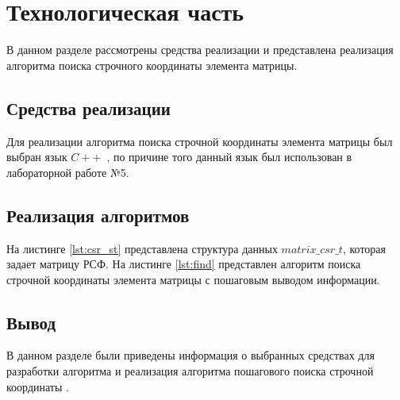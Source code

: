 \chapter{Технологическая часть}

В данном разделе рассмотрены средства реализации и представлена реализация алгоритма поиска строчного координаты элемента матрицы.

\section{Средства реализации}

Для реализации алгоритма поиска строчной координаты элемента матрицы был выбран язык $C++$~\cite{cpp-lang}, по причине того данный язык был использован в лабораторной работе №5. 

\section{Реализация алгоритмов}

На листинге \ref{lst:csr_st} представлена структура данных $matrix\_csr\_t$, которая задает матрицу РСФ.
На листинге \ref{lst:find} представлен алгоритм поиска строчной координаты элемента матрицы с пошаговым выводом информации.



\clearpage



\clearpage

\section*{Вывод}

В данном разделе были приведены информация о выбранных средствах для разработки алгоритма и реализация алгоритма пошагового поиска строчной координаты . 